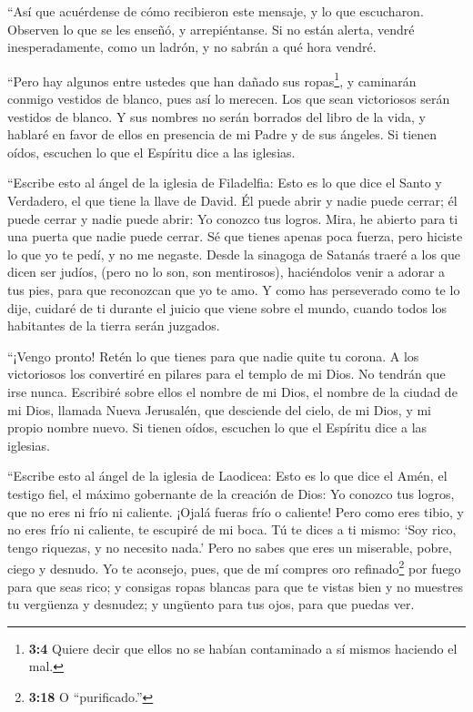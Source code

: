  ``Así que acuérdense de cómo recibieron este mensaje, y lo
que escucharon. Observen lo que se les enseñó, y arrepiéntanse. Si no
están alerta, vendré inesperadamente, como un ladrón, y no sabrán a qué
hora vendré.

 ``Pero hay algunos entre ustedes que han dañado sus
ropas\footnote{\textbf{3:4} Quiere decir que ellos no se habían
  contaminado a sí mismos haciendo el mal.}, y caminarán conmigo
vestidos de blanco, pues así lo merecen.  Los que sean
victoriosos serán vestidos de blanco. Y sus nombres no serán borrados
del libro de la vida, y hablaré en favor de ellos en presencia de mi
Padre y de sus ángeles.  Si tienen oídos, escuchen lo que el
Espíritu dice a las iglesias.

 ``Escribe esto al ángel de la iglesia de Filadelfia: Esto
es lo que dice el Santo y Verdadero, el que tiene la llave de David. Él
puede abrir y nadie puede cerrar; él puede cerrar y nadie puede abrir:
 Yo conozco tus logros. Mira, he abierto para ti una puerta
que nadie puede cerrar. Sé que tienes apenas poca fuerza, pero hiciste
lo que yo te pedí, y no me negaste.  Desde la sinagoga de
Satanás traeré a los que dicen ser judíos, (pero no lo son, son
mentirosos), haciéndolos venir a adorar a tus pies, para que reconozcan
que yo te amo.  Y como has perseverado como te lo dije,
cuidaré de ti durante el juicio que viene sobre el mundo, cuando todos
los habitantes de la tierra serán juzgados.

 ``¡Vengo pronto! Retén lo que tienes para que nadie quite
tu corona.  A los victoriosos los convertiré en pilares
para el templo de mi Dios. No tendrán que irse nunca. Escribiré sobre
ellos el nombre de mi Dios, el nombre de la ciudad de mi Dios, llamada
Nueva Jerusalén, que desciende del cielo, de mi Dios, y mi propio nombre
nuevo.  Si tienen oídos, escuchen lo que el Espíritu dice a
las iglesias.

 ``Escribe esto al ángel de la iglesia de Laodicea: Esto es
lo que dice el Amén, el testigo fiel, el máximo gobernante de la
creación de Dios:  Yo conozco tus logros, que no eres ni
frío ni caliente. ¡Ojalá fueras frío o caliente!  Pero como
eres tibio, y no eres frío ni caliente, te escupiré de mi boca.
 Tú te dices a ti mismo: `Soy rico, tengo riquezas, y no
necesito nada.' Pero no sabes que eres un miserable, pobre, ciego y
desnudo.  Yo te aconsejo, pues, que de mí compres oro
refinado\footnote{\textbf{3:18} O ``purificado.''} por fuego para que
seas rico; y consigas ropas blancas para que te vistas bien y no
muestres tu vergüenza y desnudez; y ungüento para tus ojos, para que
puedas ver.

